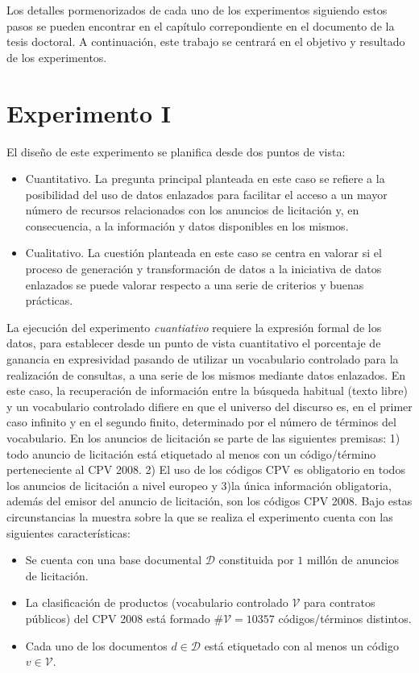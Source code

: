 \documentclass[a4paper,final,11pt,fleqn,twoside]{book}  %
\begin{document}
Los detalles pormenorizados de cada uno de los experimentos siguiendo estos pasos se pueden encontrar 
en el capítulo correpondiente en el documento de la tesis doctoral. A continuación, este trabajo 
se centrará en el objetivo y resultado de los experimentos.

\section{Experimento I}
El diseño de este experimento se planifica desde dos puntos de vista:
\begin{itemize}
 \item Cuantitativo. La pregunta principal planteada en este caso se refiere a la posibilidad del uso de datos enlazados para 
facilitar el acceso a un mayor número de recursos relacionados con los anuncios de licitación y, en consecuencia, a la información 
y datos disponibles en los mismos.
\item Cualitativo. La cuestión planteada en este caso se centra en valorar si el proceso de generación y transformación de datos 
a la iniciativa de datos enlazados se puede valorar respecto a una serie de criterios y buenas prácticas.
\end{itemize}

La ejecución del experimento \textit{cuantiativo} requiere la expresión formal de los datos, para establecer desde un punto 
de vista cuantitativo el porcentaje de ganancia en expresividad pasando de utilizar un vocabulario controlado para la realización 
de consultas, a una serie de los mismos mediante datos enlazados. En este caso, la recuperación de información 
entre la búsqueda habitual (texto libre) y un vocabulario controlado difiere en que el universo del discurso es, 
en el primer caso infinito y en el segundo finito, determinado por el número de términos del vocabulario. En los anuncios 
de licitación se parte de las siguientes premisas: 1) todo anuncio de licitación está etiquetado al menos 
con un código/término perteneciente al CPV 2008. 2) El uso de los códigos CPV es obligatorio en todos los anuncios de licitación a nivel europeo y 
3)la única información obligatoria, además del emisor del anuncio de licitación, son los códigos CPV 2008. Bajo estas circunstancias 
la muestra sobre la que se realiza el experimento cuenta con las siguientes características:
\begin{itemize}
 \item Se cuenta con una base documental $\mathcal{D}$ constituida por $1$ millón de anuncios de licitación.
 \item La clasificación de productos (vocabulario controlado $\mathcal{V}$ para contratos públicos) 
del CPV 2008 está formado $\#\mathcal{V} = 10357$ códigos/términos distintos.
 \item Cada uno de los documentos $d \in \mathcal{D}$ está etiquetado con al menos un código $v \in \mathcal{V}$.
\end{itemize}
\end{document}
